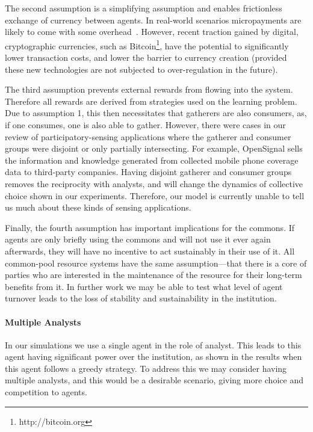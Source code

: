 The second assumption is a simplifying assumption and enables frictionless
exchange of currency between agents. In real-world scenarios micropayments are
likely to come with some overhead~\citep{papaefstathiou2004}. However, recent
traction gained by digital, cryptographic currencies, such as Bitcoin\footnote{http://bitcoin.org}, have
the potential to significantly lower transaction costs, and lower the barrier
to currency creation (provided these new technologies are not subjected to
over-regulation in the future).

The third assumption prevents external rewards from flowing into the system.
Therefore all rewards are derived from strategies used on the learning
problem. Due to assumption 1, this then necessitates that gatherers are also
consumers, as, if one consumes, one is also able to gather. However, there were
cases in our review of participatory-sensing applications where the gatherer
and consumer groups were disjoint or only partially intersecting. For example,
OpenSignal sells the information and knowledge generated from collected
mobile phone coverage data to third-party companies. Having disjoint gatherer
and consumer groups removes the reciprocity with analysts, and will change the
dynamics of collective choice shown in our experiments. Therefore,
our model is currently unable to tell us much about these kinds of sensing
applications.

Finally, the fourth assumption has important implications for the commons. If
agents are only briefly using the commons and  will not use it ever again
afterwards, they will have no incentive to act sustainably in their use of it.
All common-pool resource systems have the same assumption---that there is a
core of parties who are interested in the maintenance of the resource for
their long-term benefits from it.  In further work we may be able to test what
level of agent turnover leads to the loss of stability and sustainability in
the institution.

\paragraph{Multiple Analysts}  In our simulations we use a single agent in the
role of analyst. This leads to this agent having significant power over the
institution, as shown in the results when this agent follows a greedy
strategy. To address this we may consider having multiple analysts, and this
would be a desirable scenario, giving more choice and competition to agents.


